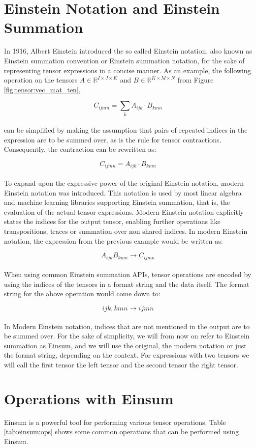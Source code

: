 \section{Einstein Notation and Einstein Summation}
In 1916, Albert Einstein introduced the so called Einstein notation, also known as
Einstein summation convention or Einstein summation notation, for the sake of
representing tensor expressions in a concise manner. As an example, the following
operation on the tensors $A \in \mathbb{R}^{I \times J \times K}$ and
$B \in \mathbb{R}^{K \times M \times N}$ from Figure \ref{fig:tensor:vec_mat_ten},

\[C_{ijmn} = \sum_{k}A_{ijk} \cdot B_{kmn}\]
\noindent
\\
can be simplified by making the assumption that pairs of repeated indices in the expression
are to be summed over, as is the rule for tensor contractions. Consequently, the contraction
can be rewritten as:

\[C_{ijmn} = A_{ijk} \cdot B_{kmn}\]
\noindent
\\
To expand upon the expressive power of the original Einstein notation, modern Einstein
notation was introduced. This notation is used by most linear algebra and machine
learning libraries supporting Einstein summation, that is, the evaluation of the actual
tensor expressions. Modern Einstein notation explicitly states the indices for the
output tensor, enabling further operations like transpositions, traces or summation
over non shared indices. In modern Einstein notation, the expression from the previous
example would be written as:

\[A_{ijk}B_{kmn} \rightarrow C_{ijmn}\]
\noindent
\\
When using common Einstein summation APIs, tensor operations are encoded by using the
indices of the tensors in a format string and the data itself.
\newpage
\noindent
The format string for the above operation would come down to:

\[ijk,kmn \rightarrow ijmn\]
\noindent
\\
In Modern Einstein notation, indices that are not mentioned in the output are to be
summed over. For the sake of simplicity, we will from now on refer to Einstein summation
as Einsum, and we will use the original, the modern notation or just the format
string, depending on the context. For expressions with two tensors we will call the first
tensor the left tensor and the second tensor the right tensor.

\section{Operations with Einsum}
Einsum is a powerful tool for performing various tensor operations. Table \ref{tab:einsum:ops}
shows some common operations that can be performed using Einsum.

